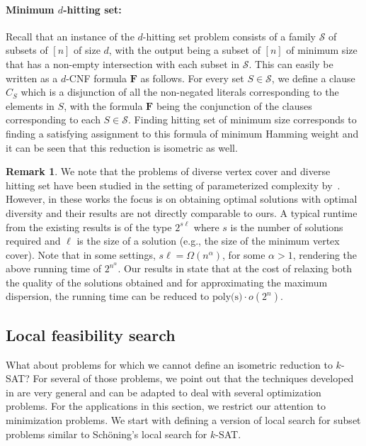 \documentclass[11pt, letterpaper]{article}
\theoremstyle{definition}
\newtheorem{remark}{Remark}
\newcommand{\f}{\mathbf{F}}
\newcommand{\sch}{Sch\"{o}ning\xspace}
\begin{document}
\paragraph{Minimum $d$-hitting set:} Recall that an instance of the $d$-hitting set problem consists of a family $\mathcal{S}$ of subsets of $[n]$ of size $d$, with the output being a subset of $[n]$ of minimum size that has a non-empty intersection with each subset in $\mathcal{S}$. This can easily be written as a $d$-CNF formula $\f$ as follows. For every set $S \in \mathcal{S}$, we define a clause $C_S$ which is a disjunction of all the non-negated literals corresponding to the elements in $S$, with the formula $\f$ being the conjunction of the clauses corresponding to each $S \in \mathcal{S}$. Finding hitting set of minimum size corresponds to finding a satisfying assignment to this formula of minimum Hamming weight and it can be seen that this reduction is isometric as well.  

\begin{remark}
    We note that the problems of diverse vertex cover and diverse hitting set have been studied in the setting of parameterized complexity by~\cite{baste2019fpt, baste2022diversity}. However, in these works the focus is on obtaining optimal solutions with optimal diversity and their results are not directly comparable to ours. A typical runtime from the existing results is of the type $2^{s\ell}$ where $s$ is the number of solutions required and $\ell$ is the size of a solution (e.g., the size of the minimum vertex cover). Note that in some settings, $s \ell = \Omega(n^{\alpha})$, for some $\alpha >1$, rendering the above running time of $2^{n^{\alpha}}$. Our results in  state that at the cost of relaxing both the quality of the solutions obtained and for approximating the maximum dispersion, the running time can be reduced to $\text{poly(s)} \cdot o\left(2^n\right)$.
\end{remark}






\subsection{Local feasibility search }\label{sec:lfs}
What about problems for which we cannot define an isometric reduction to $k$-SAT? For several of those problems, we point out that the techniques developed in  are very general and can be adapted to deal with several optimization problems. For the applications in this section, we restrict our attention to minimization problems. We start with defining a version of local search for subset problems similar to \sch's local search for $k$-SAT. 
\end{document}
